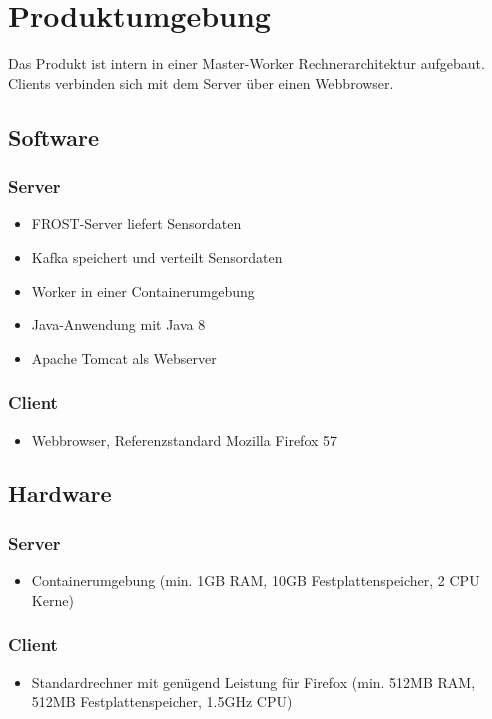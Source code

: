 \chapter{Produktumgebung}
Das Produkt ist intern in einer Master-Worker Rechnerarchitektur aufgebaut. Clients verbinden sich mit dem Server über einen Webbrowser.
\section{Software}
\subsection{Server}
\begin{itemize}
	\item FROST-Server liefert Sensordaten
	\item Kafka speichert und verteilt Sensordaten
	\item Worker in einer Containerumgebung
	\item Java-Anwendung mit Java 8
	\item Apache Tomcat als Webserver
\end{itemize}
\subsection{Client}
\begin{itemize}
	\item Webbrowser, Referenzstandard Mozilla Firefox 57
\end{itemize}
\section{Hardware}
\subsection{Server}
\begin{itemize}
	\item Containerumgebung (min. 1GB RAM, 10GB Festplattenspeicher, 2 CPU Kerne)
\end{itemize}
\subsection{Client}
\begin{itemize}
	\item Standardrechner mit genügend Leistung für Firefox (min. 512MB RAM, 512MB Festplattenspeicher, 1.5GHz CPU)
\end{itemize}